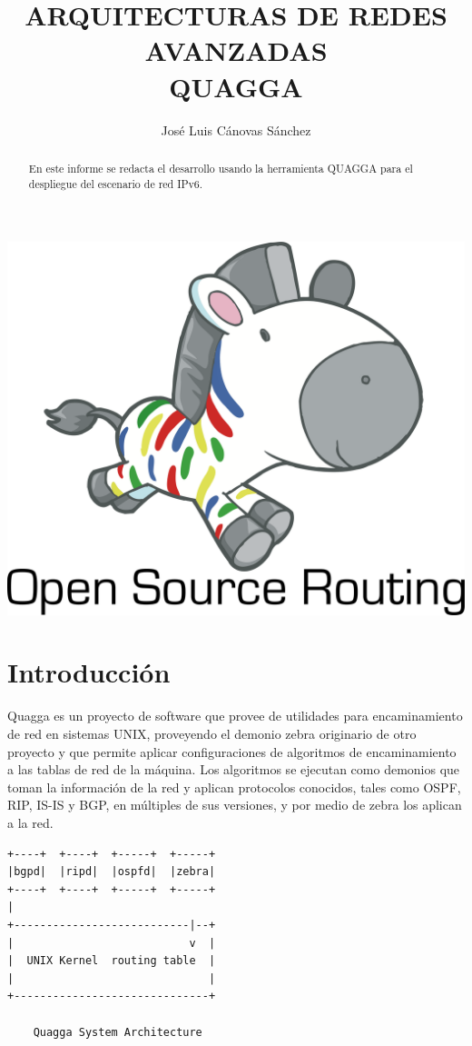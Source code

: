 \documentclass{article}
\author{José Luis Cánovas Sánchez}
\title{ARQUITECTURAS DE REDES AVANZADAS\\QUAGGA}
\date{}
\begin{document}
\maketitle

\begin{center}
	\includegraphics[scale=0.3]{images/mascota.png}
\end{center}

\begin{abstract}
	En este informe se redacta el desarrollo usando la herramienta QUAGGA para el despliegue del escenario de red IPv6.
\end{abstract}

\tableofcontents

\section{Introducción}

Quagga es un proyecto de software que provee de utilidades para encaminamiento de red en sistemas UNIX, proveyendo el demonio zebra originario de otro proyecto y que permite aplicar configuraciones de algoritmos de encaminamiento a las tablas de red de la máquina. Los algoritmos se ejecutan como demonios que toman la información de la red y aplican protocolos conocidos, tales como OSPF, RIP, IS-IS y BGP, en múltiples de sus versiones, y por medio de zebra los aplican a la red.

\begin{center}
	\begin{BVerbatim}
+----+  +----+  +-----+  +-----+
|bgpd|  |ripd|  |ospfd|  |zebra|
+----+  +----+  +-----+  +-----+
|
+---------------------------|--+
|                           v  |
|  UNIX Kernel  routing table  |
|                              |
+------------------------------+

    Quagga System Architecture
	\end{BVerbatim}
\end{center}
\end{document}
